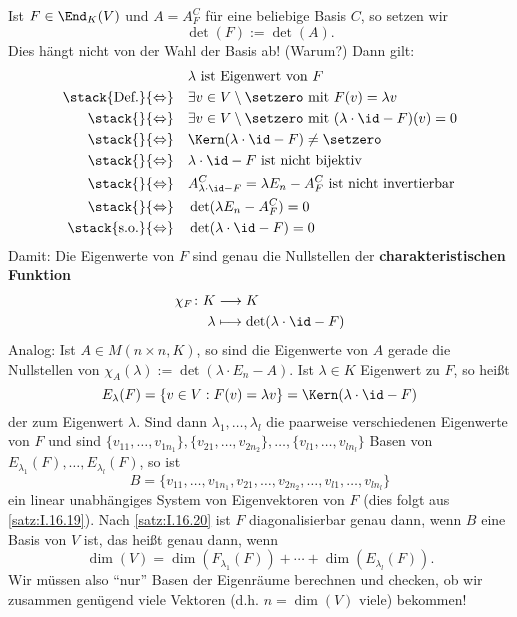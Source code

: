Ist $F \in \End_K(V)$ und $A = A_F^C$ für eine beliebige Basis $C$, so setzen wir
\[
	\det(F) := \det(A).
\]
Dies hängt nicht von der Wahl der Basis ab! (Warum?)
Dann gilt:
\begin{align*}
	&\lambda \text{ ist Eigenwert von } F \\
\stack{\text{Def.}}{\Leftrightarrow} \quad &\exists v \in V \setminus \setzero \text{ mit } F(v) = \lambda v \\
\stack{}{\Leftrightarrow} \quad &\exists v \in V \setminus \setzero \text{ mit } (\lambda \cdot \id - F)(v) = 0 \\
\stack{}{\Leftrightarrow} \quad &\Kern(\lambda \cdot \id - F) \neq \setzero \\
\stack{}{\Leftrightarrow} \quad &\lambda \cdot \id-F \text{ ist nicht bijektiv} \\
\stack{}{\Leftrightarrow} \quad &A^C_{\lambda \cdot \id-F} = \lambda E_n - A_F^C \text{ ist nicht invertierbar} \\
\stack{}{\Leftrightarrow} \quad &\det(\lambda E_n - A_F^C) = 0 \\
\stack{\text{s.o.}}{\Leftrightarrow} \quad &\det(\lambda \cdot \id - F) = 0
\end{align*}
Damit: Die Eigenwerte von $F$ sind genau die Nullstellen der \textbf{charakteristischen Funktion} 
\begin{align*}
	\chi_F \colon K &\longrightarrow K \\
	\lambda &\longmapsto \det(\lambda \cdot \id - F)
\end{align*}
Analog: Ist $A \in M(n \times n,K)$, so sind die Eigenwerte von $A$ gerade die Nullstellen von $\chi_A(\lambda) := \det(\lambda \cdot E_n - A)$.
\newpage
{}
Ist $\lambda \in K$ Eigenwert zu $F$, so heißt
\[
	E_\lambda(F) = \{v \in V : F(v) = \lambda v\} = \Kern(\lambda \cdot \id - F)
\]
der  zum Eigenwert $\lambda$.
Sind dann $\lambda_1,\dots,\lambda_l$ die paarweise verschiedenen Eigenwerte von $F$ und sind $\{v_{11},\dots,v_{1n_1}\}, \{v_{21},\dots,v_{2n_2}\}, \dots, \{v_{l1},\dots,v_{ln_l}\}$ Basen von $E_{\lambda_1}(F), \dots, E_{\lambda_l}(F)$, so ist
\[
	B = \{v_{11},\dots,v_{1n_1},v_{21},\dots,v_{2n_2},\dots,v_{l1},\dots,v_{ln_l}\}
\]
ein linear unabhängiges System von Eigenvektoren von $F$ (dies folgt aus \autoref{satz:I.16.19}).
Nach \autoref{satz:I.16.20} ist $F$ diagonalisierbar genau dann, wenn $B$ eine Basis von $V$ ist, das heißt genau dann, wenn
\[
	\dim(V) = \dim(F_{\lambda_1}(F)) + \cdots + \dim(E_{\lambda_l}(F)).
\]
Wir müssen also \enquote{nur} Basen der Eigenräume berechnen und checken, ob wir zusammen genügend viele Vektoren (d.h. $n = \dim(V)$ viele) bekommen!

